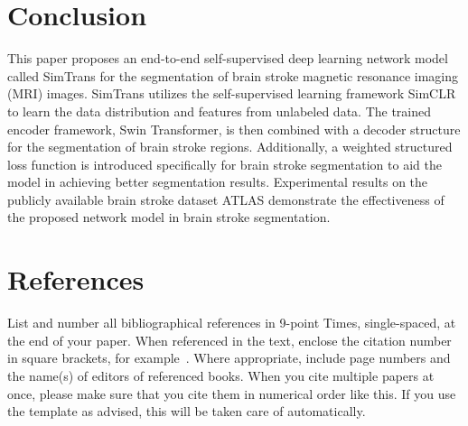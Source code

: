 \documentclass[10pt,twocolumn,letterpaper]{article}
\begin{document}

\section{Conclusion}
\label{sec:conclusion}

This paper proposes an end-to-end self-supervised deep learning network model called SimTrans for the segmentation of brain stroke magnetic resonance imaging (MRI) images. SimTrans utilizes the self-supervised learning framework SimCLR to learn the data distribution and features from unlabeled data. The trained encoder framework, Swin Transformer, is then combined with a decoder structure for the segmentation of brain stroke regions. Additionally, a weighted structured loss function is introduced specifically for brain stroke segmentation to aid the model in achieving better segmentation results. Experimental results on the publicly available brain stroke dataset ATLAS demonstrate the effectiveness of the proposed network model in brain stroke segmentation.

\section{References}
\label{sec:references}

List and number all bibliographical references in 9-point Times, single-spaced, at the end of your paper.
When referenced in the text, enclose the citation number in square brackets, for
example~.
Where appropriate, include page numbers and the name(s) of editors of referenced books.
When you cite multiple papers at once, please make sure that you cite them in numerical order like this.
If you use the template as advised, this will be taken care of automatically.



{\small


}
\end{document}
